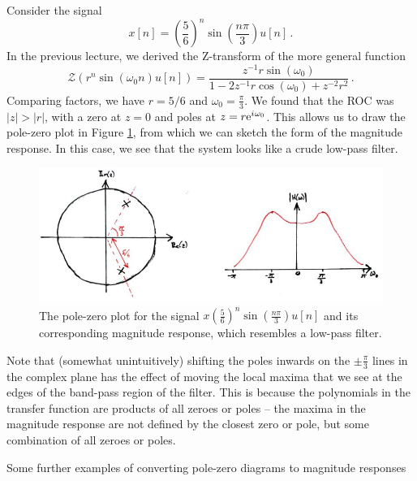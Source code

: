 \begin{exmp}
  Consider the signal
  \begin{displaymath}
    x[n] = \left(\frac{5}{6}\right)^n\sin\left(\frac{n\pi}{3}\right)u[n] \,.
  \end{displaymath}
  In the previous lecture, we derived the Z-transform of the more general function
  \begin{displaymath}
    \mathscr{Z}(r^n\sin(\omega_0 n)u[n]) = \frac{z^{-1}r\sin(\omega_0)}{1 - 2z^{-1}r\cos(\omega_0) + z^{-2}r^2} \,.
  \end{displaymath}
  Comparing factors, we have $r=5/6$ and $\omega_0=\frac{\pi}{3}$.
  We found that the ROC was $|z| > |r|$, with a zero at $z = 0$ and poles
  at $z = r\mathrm{e}^{{i\mkern1mu}\omega_0}$. This allows us to draw the pole-zero plot
  in Figure \ref{fig::lecture_9_poles_zeroes_example_1},
  from which we can sketch the form of the magnitude response.
  In this case, we see that the system looks like a crude low-pass filter.
  \begin{figure}[!htb]
    \includegraphics[width=\textwidth]{images/lecture_9_poles_zeroes_example_1.JPG}
    \caption{
      The pole-zero plot for the signal $x\left(\frac{5}{6}\right)^n\sin\left(\frac{n\pi}{3}\right)u[n]$
      and its corresponding magnitude response, which resembles a low-pass
      filter.
    }
    \label{fig::lecture_9_poles_zeroes_example_1}
  \end{figure}
  Note that (somewhat unintuitively) shifting the poles inwards on the
  $\pm\frac{\pi}{3}$ lines in the complex plane has the effect of moving
  the local maxima that we see at the edges of the band-pass region of the
  filter. This is because the polynomials in the transfer function are products
  of all zeroes or poles -- the maxima in the magnitude response
  are not defined by the closest zero or pole, but some combination of all
  zeroes or poles.
\end{exmp}
%
Some further examples of converting pole-zero diagrams to magnitude responses
